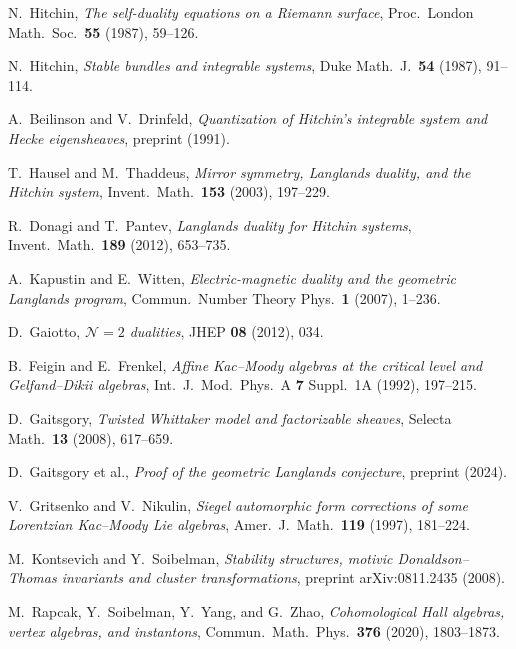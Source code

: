 \documentclass[11pt]{article}
\theoremstyle{definition}
\theoremstyle{remark}
\newcommand{\cN}{\mathcal{N}}
\begin{document}
\begin{enumerate}[label={[\arabic*]}]
 \item N.~Hitchin, \textit{The self-duality equations on a Riemann surface}, Proc.\ London Math.\ Soc.\ \textbf{55} (1987), 59--126.
 \item N.~Hitchin, \textit{Stable bundles and integrable systems}, Duke Math.\ J.\ \textbf{54} (1987), 91--114.
 \item A.~Beilinson and V.~Drinfeld, \textit{Quantization of Hitchin's integrable system and Hecke eigensheaves}, preprint (1991).
 \item T.~Hausel and M.~Thaddeus, \textit{Mirror symmetry, Langlands duality, and the Hitchin system}, Invent.\ Math.\ \textbf{153} (2003), 197--229.
 \item R.~Donagi and T.~Pantev, \textit{Langlands duality for Hitchin systems}, Invent.\ Math.\ \textbf{189} (2012), 653--735.
 \item A.~Kapustin and E.~Witten, \textit{Electric-magnetic duality and the geometric Langlands program}, Commun.\ Number Theory Phys.\ \textbf{1} (2007), 1--236.
 \item D.~Gaiotto, \textit{$\cN = 2$ dualities}, JHEP \textbf{08} (2012), 034.
 \item B.~Feigin and E.~Frenkel, \textit{Affine Kac--Moody algebras at the critical level and Gelfand--Dikii algebras}, Int.\ J.\ Mod.\ Phys.\ A \textbf{7} Suppl.\ 1A (1992), 197--215.
 \item D.~Gaitsgory, \textit{Twisted Whittaker model and factorizable sheaves}, Selecta Math.\ \textbf{13} (2008), 617--659.
 \item D.~Gaitsgory et al., \textit{Proof of the geometric Langlands conjecture}, preprint (2024).
 \item V.~Gritsenko and V.~Nikulin, \textit{Siegel automorphic form corrections of some Lorentzian Kac--Moody Lie algebras}, Amer.\ J.\ Math.\ \textbf{119} (1997), 181--224.
 \item M.~Kontsevich and Y.~Soibelman, \textit{Stability structures, motivic Donaldson--Thomas invariants and cluster transformations}, preprint arXiv:0811.2435 (2008).
 \item M.~Rapcak, Y.~Soibelman, Y.~Yang, and G.~Zhao, \textit{Cohomological Hall algebras, vertex algebras, and instantons}, Commun.\ Math.\ Phys.\ \textbf{376} (2020), 1803--1873.
\end{enumerate}
\end{document}
